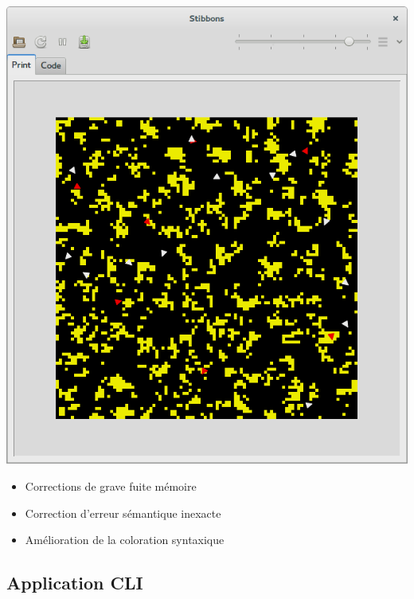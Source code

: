 \begin{frame}
\begin{center}
\includegraphics[scale=0.16]{doc/Presentation/screenshot/stibbons-0-5-3.png}
\end{center}

\begin{itemize}
	\item Corrections de grave fuite mémoire
	\item Correction d'erreur sémantique inexacte
	\item Amélioration de la coloration syntaxique
\end{itemize}
\end{frame}

\subsection{Application CLI}

